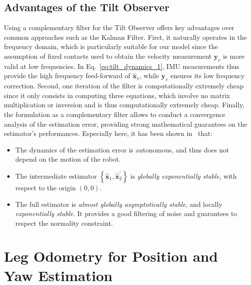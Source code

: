 \documentclass{IJCAS}
\begin{document}
\subsection{Advantages of the Tilt Observer}
Using a complementary filter for the Tilt Observer offers key advantages over common approaches such as the Kalman Filter. First, it naturally operates in the frequency domain, which is particularly suitable for our model since the assumption of fixed contacts used to obtain the velocity measurement $\boldsymbol{y}_v$ is more valid at low frequencies. In Eq.~\eqref{eq:tilt_dynamics_1}, IMU measurements thus provide the high frequency feed-forward of $\hat{\boldsymbol{x}}_{1}$, while $\boldsymbol{y}_v$ ensures its low frequency correction. Second, one iteration of the filter is computationally extremely cheap since it only consists in computing three equations, which involve no matrix multiplication or inversion and is thus computationally extremely cheap. Finally, the formulation as a complementary filter allows to conduct a convergence analysis of the estimation error, providing strong mathematical guarantees on the estimator's performances. Especially here, it has been shown in~\cite{benallegue2020LyapunovStableOrientationEstimatorHumanoids} that:
\begin{itemize}[leftmargin=0pt]
    \item The dynamics of the estimation error is autonomous, and thus does not depend on the motion of the robot. 
    \item The intermediate estimator $\left\{\hat{\boldsymbol{x}}_{1}, \hat{\boldsymbol{x}}_{2}^{\prime} \right\}$ is \emph{globally exponentially stable}, with respect to the origin $\left(0,0\right)$.
    \item The full estimator is \emph{almost globally asymptotically stable}, and locally \emph{exponentially stable}. It provides a good filtering of noise and guarantees to respect the normality constraint.
\end{itemize}

\section{Leg Odometry for Position and Yaw Estimation} \label{sec:leg_odometry}
\end{document}
